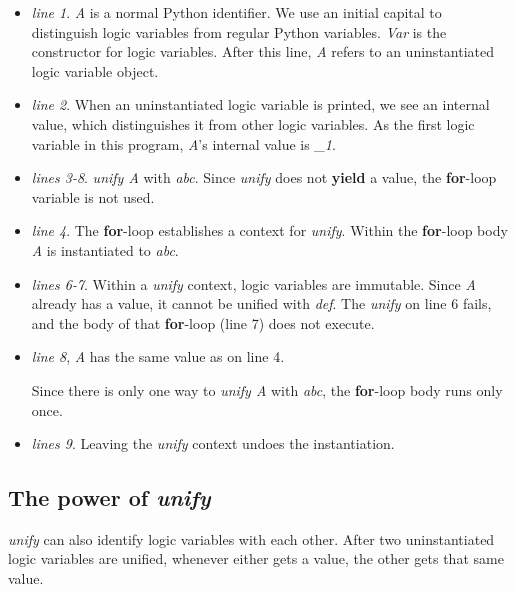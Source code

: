 \begin{itemize}
    \item \textit{line 1}. \textit{A} is a normal Python identifier. We use an initial capital to distinguish logic variables from regular Python variables. \textit{Var} is the constructor for logic variables. After this line, \textit{A} refers to an uninstantiated  logic variable object.

    \item \textit{line 2}. When an uninstantiated logic variable is printed, we see an internal value, which  distinguishes it from other logic variables. As the first logic variable in this program, \textit{A}'s internal value is \textit{\_1}.

    \item \textit{lines 3-8}.  \textit{unify A} with \textit{abc}. Since \textit{unify} does not \textbf{yield} a value, the \textbf{for}-loop variable is not used. 
    
    \item \textit{line 4}. The \textbf{for}-loop establishes a context for \textit{unify}. Within the \textbf{for}-loop body \textit{A} is instantiated to  \textit{abc}.

    \item \textit{lines 6-7}. Within a \textit{unify} context, logic variables are immutable. Since \textit{A} already has a value, it cannot be unified with \textit{def}. The \textit{unify} on line 6 fails, and the body of that \textbf{for}-loop (line 7) does not execute. 
    
    \item \textit{line 8}, \textit{A} has the same value as on line 4.
    
    \smallv Since there is only one way to \textit{unify A} with \textit{abc}, the \textbf{for}-loop body runs only once.  
    
    \item \textit{lines 9}. Leaving the \textit{unify} context undoes the instantiation.

\end{itemize}

\subsection{The power of \textit{unify}}
\textit{unify} can also identify logic variables with each other. After two uninstantiated logic variables are unified, whenever either gets a value, the other gets that same value.

